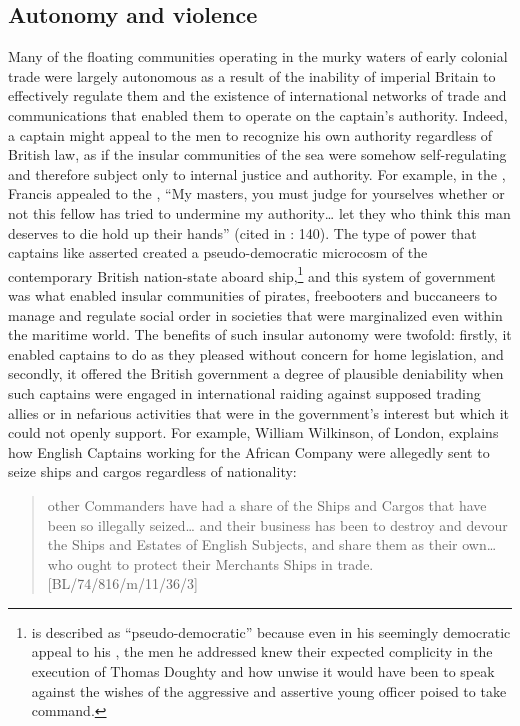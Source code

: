 \subsection{{Autonomy and violence}}\label{sec:4.2.2}

Many of the floating communities operating in the murky waters of early colonial trade were largely autonomous as a result of the inability of imperial Britain to effectively regulate them and the existence of international networks of  trade and communications that enabled them to operate on the captain’s authority. Indeed, a captain might appeal to the men to recognize his own authority regardless of British law, as if the insular communities of the sea were somehow self-regulating and therefore subject only to internal justice and authority. For example, in the , Francis  appealed to the , “My masters, you must judge for yourselves whether or not this fellow has tried to undermine my authority… let they who think this man deserves to die hold up their hands” (cited in \citealt{Bicheno2012}: 140). The type of power that captains like  asserted created a pseudo-democratic microcosm of the contemporary British nation-state aboard ship,\footnote{ is described as “pseudo-democratic” because even in his seemingly democratic appeal to his , the men he addressed knew their expected complicity in the execution of Thomas Doughty and how unwise it would have been to speak against the wishes of the aggressive and assertive young officer poised to take command.}  and this system of government was what enabled insular communities of pirates, freebooters and buccaneers to manage and regulate social order in societies that were marginalized even within the maritime world. The benefits of such insular autonomy were twofold: firstly, it enabled captains to do as they pleased without concern for home legislation, and secondly, it offered the British government a degree of plausible deniability when such captains were engaged in international raiding against supposed trading allies or in nefarious activities that were in the government’s interest but which it could not openly support. For example, William Wilkinson,  of London, explains how English Captains working for the African Company were allegedly sent to seize  ships and cargos regardless of nationality: 

\begin{quotation}
other Commanders have had a share of the Ships and Cargos that have been so illegally seized… and their business has been to destroy and devour the Ships and Estates of English Subjects, and share them as their own… who ought to protect their Merchants Ships in trade. [BL/74/816/m/11/36/3] 
\end{quotation}

